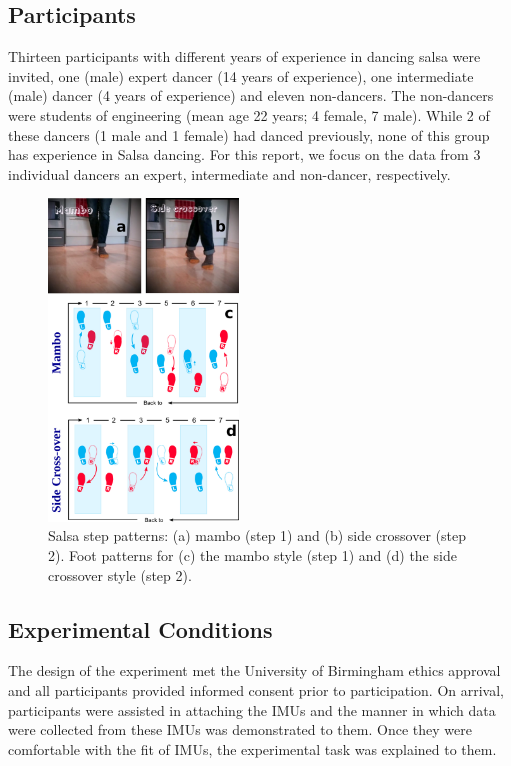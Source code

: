 \documentclass[10pt,journal,compsoc]{IEEEtran}
\begin{document}
\subsection{Participants}
Thirteen participants with different years of experience in
dancing salsa were invited, one (male) expert dancer
(14 years of experience), one intermediate (male) dancer
(4 years of experience) and eleven non-dancers. The
non-dancers were students of engineering (mean age 22 years; 4
female, 7 male). While 2 of these dancers (1 male and 
1 female) had danced previously, none of this group has
experience in Salsa dancing. For this report, we focus on the 
data from 3 individual dancers an expert, intermediate and
non-dancer, respectively.
\begin{figure}[!htb]
\centering    
\includegraphics[width=0.45\textwidth]{steps_v00}
\caption[PA]{Salsa step patterns: (a) mambo (step 1) and (b) side crossover
(step 2). Foot patterns for (c) the mambo style (step 1) and (d) the side crossover style (step 2).}
\label{fig:steps}
\end{figure}




\subsection{Experimental Conditions}
The design of the experiment met the University of Birmingham
ethics approval and all participants provided informed consent 
prior to participation. On arrival, participants were assisted 
in attaching the IMUs and the manner in which data were collected 
from these IMUs was demonstrated to them. 
Once they were comfortable with the fit of IMUs, the experimental 
task was explained to them.
\end{document}
